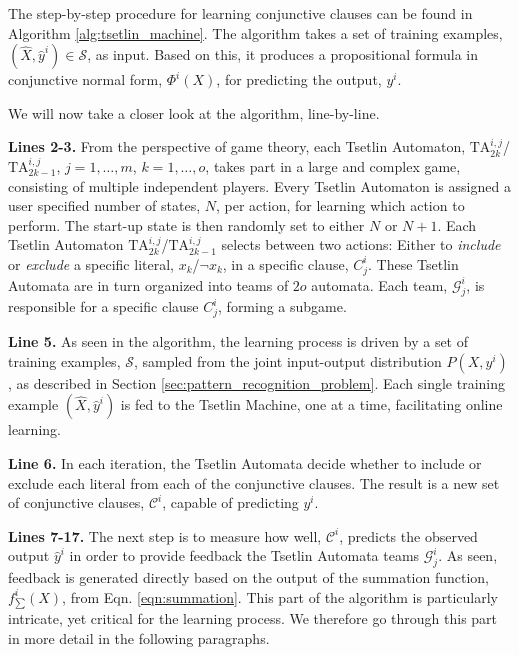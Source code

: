 \documentclass[11pt,a4paper]{article}
\begin{document}
The step-by-step procedure for learning conjunctive clauses can be found in Algorithm \ref{alg:tsetlin_machine}. The algorithm takes a set of training examples, $(\hat{X},\hat{y}^i) \in \mathcal{S}$, as input. Based on this, it produces a propositional formula in conjunctive normal form, $\Phi^i(X)$, for predicting the output, $y^i$. 

We will now take a closer look at the algorithm, line-by-line.

{\bf Lines 2-3.} From the perspective of game theory, each Tsetlin Automaton, $\mathrm{TA}^{i,j}_{2k}$/$\mathrm{TA}^{i,j}_{2k-1}$, $j=1,\ldots, m$, $k=1,\ldots, o$, takes part in a large and complex game, consisting of multiple independent players. Every Tsetlin Automaton is assigned a user specified number of states, $N$, per action, for learning which action to perform. The start-up state is then randomly set to either $N$ or $N+1$. Each Tsetlin Automaton $\mathrm{TA}^{i,j}_{2k}$/$\mathrm{TA}^{i,j}_{2k-1}$ selects between two actions: Either to \emph{include} or \emph{exclude} a specific literal, $x_k$/$\lnot x_k$, in a specific clause, $C_j^i$. These Tsetlin Automata are in turn organized into teams of $2o$ automata. Each team,  $\mathcal{G}^i_j$, is responsible for a specific clause $C^i_j$, forming a subgame.

{\bf Line 5.} As seen in the algorithm, the learning process is driven by a set of training examples, $\mathcal{S}$, sampled from the joint input-output distribution $P(X, y^i)$, as described in Section \ref{sec:pattern_recognition_problem}. Each single training example $(\hat{X}, \hat{y}^i)$ is fed to the Tsetlin Machine, one at a time, facilitating online learning.

{\bf Line 6.}  In each iteration, the Tsetlin Automata decide whether to include or exclude each literal from each of the conjunctive clauses. The result is a new  set of conjunctive clauses, $\mathcal{C}^i$, capable of predicting $y^i$.

{\bf Lines 7-17.} The next step is to measure how well, $\mathcal{C}^i$, predicts the observed output $\hat{y}^i$ in order to provide feedback the Tsetlin Automata teams $\mathcal{G}^i_j$. As seen, feedback is generated directly based on the output of the summation function, $f^i_{\sum}(X)$, from Eqn. \ref{eqn:summation}. This part of the algorithm is particularly intricate, yet critical for the learning process. We therefore go through this part in more detail in the following paragraphs.
\end{document}
